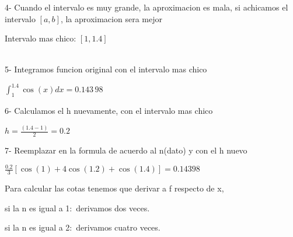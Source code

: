 \documentclass{article}
\begin{document}
4- Cuando el intervalo es muy grande, la aproximacion es mala, si achicamos
el intervalo $\left[ a,b\right] $, la aproximacion sera mejor

Intervalo mas chico: $\left[ 1,1.4\right] $ \ \ \ \ \ \ \ \ \ \ \ \ \ \ \ \
\ \ \ \ \ \ \ \ \ \ \ \ \ \ \ \ \ \ \ \ \ \ \ \ \ \ \ \ \ \ \ \ \ \ \ \ 

5- Integramos funcion original con el intervalo mas chico

$\int_{1}^{1.4}\cos (x)dx=\allowbreak 0.143\,98$

6- Calculamos el h nuevamente, con el intervalo mas chico

$h=\frac{(1.4-1)}{2}=\allowbreak 0.2$

7- Reemplazar en la formula de acuerdo al n(dato) y con el h nuevo

$\frac{0.2}{3}\left[ \cos (1)+4\cos (1.2)+\cos (1.4)\right] =0.14398$

Para calcular las cotas tenemos que derivar a f respecto de x,

si la n es igual a 1:\ derivamos dos veces.

si la n es igual a 2:\ derivamos cuatro veces.
\end{document}
